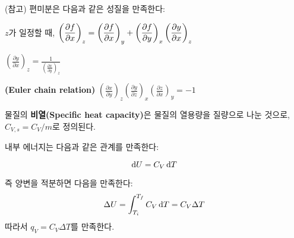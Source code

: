             \par \begin{fact}[편미분의 성질]
            (참고) 편미분은 다음과 같은 성질을 만족한다:
                \begin{enum}
                    \item $z$가 일정할 때, $\displaystyle\left( \frac{\partial f}{\partial x} \right)_z = \left(\frac{\partial f}{\partial x} \right)_y + \left(\frac{%
                    \partial f}{\partial y}\right)_x \left(\frac{\partial y}{\partial x} \right)_z$
                    \item $\displaystyle\left( \frac{\partial y}{\partial x} \right)_z = \displaystyle\frac{1}{\left( \displaystyle\frac{\partial x}{\partial y}\right)_z}$
                    \item \textbf{(Euler chain relation)} $\displaystyle\left(\frac{\partial x}{\partial y}\right)_z \left(\frac{\partial y}{\partial z}\right)_x \left( \frac{\partial z}{\partial x}\right)_y = -1$ 
                \end{enum}
            \end{fact}
            물질의 \textbf{비열(Specific heat capacity)}은 물질의 열용량을 질량으로 나눈 것으로, $C_{V,s} = C_V / m$로 정의된다.
            \par 내부 에너지는 다음과 같은 관계를 만족한다:
            \begin{obs}
                \begin{equation*}
                    \operatorname{d\!} U = C_V \operatorname{d\!} T
                \end{equation*}
            \end{obs}
            즉 양변을 적분하면 다음을 만족한다:
                \begin{equation*}
                    \Delta U = \int_{T_i}^{T_f}C_V \operatorname{d\!} T = C_V \Delta T
                \end{equation*}
            따라서 $q_V = C_V \Delta T$를 만족한다.
